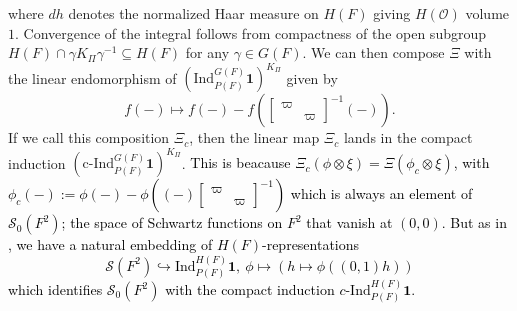 \documentclass{amsart}
\theoremstyle{plain}
\theoremstyle{plain}
\theoremstyle{remark}
\begin{document}
where $dh$ denotes the normalized Haar measure on $H(F)$ giving $H(\mathcal{O})$ volume $1$. Convergence of the integral follows from compactness of the open subgroup $H(F)\cap \gamma K_\Pi\gamma^{-1}\subseteq H(F)$ for any $\gamma\in G(F)$. We can then compose $\Xi$ with the linear endomorphism of $\left(\mathrm{Ind}_{P(F)}^{G(F)}\mathbf{1}\right)^{K_\Pi}$ given by $$f(-)\mapsto f(-)- f(\left[\begin{smallmatrix}
    \varpi & \\
    & \varpi
\end{smallmatrix}\right]^{-1}(-)).$$If we call this composition $\Xi_c$, then the linear map $\Xi_c$ lands in the compact induction $\left(\mathrm{c}\text{-}\mathrm{Ind}_{P(F)}^{G(F)}\mathbf{1}\right)^{K_\Pi}$. \textcolor{black}{This is beacause $\Xi_c(\phi\otimes\xi)=\Xi(\phi_c\otimes\xi)$, with $\phi_c(-):=\phi(-)-\phi((-)\left[\begin{smallmatrix}
    \varpi& \\
    & \varpi
\end{smallmatrix}\right]^{-1})$ which is always an element of $\mathcal{S}_0(F^2)$; the space of Schwartz functions on $F^2$ that vanish at $(0,0)$. But as in \cite[Page $397$]{jacquet1983rankin}, we have a natural embedding of $H(F)$-representations
$$\mathcal{S}(F^2)\hookrightarrow \mathrm{Ind}_{P(F)}^{H(F)}\mathbf{1},\ \phi\mapsto(h\mapsto \phi((0,1)h))$$
which identifies $\mathcal{S}_0(F^2)$ with the compact induction $c$-$\mathrm{Ind}_{P(F)}^{H(F)}\mathbf{1}$.} 
\end{document}
